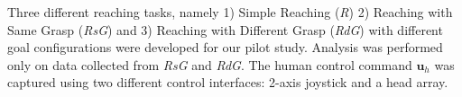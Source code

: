 \documentclass[conference]{IEEEtran}
\begin{document}
Three different reaching tasks, namely 1) Simple Reaching (\textit{R}) 2) Reaching with Same Grasp (\textit{RsG}) and 3) Reaching with Different Grasp (\textit{RdG}) with different goal configurations were developed for our pilot study.
%
%
%
Analysis was performed only on data collected from \textit{RsG} and \textit{RdG}. The human control command $\boldsymbol{u}_h$ was captured using two different control interfaces: 2-axis joystick and a head array.
%
%
%
\end{document}

